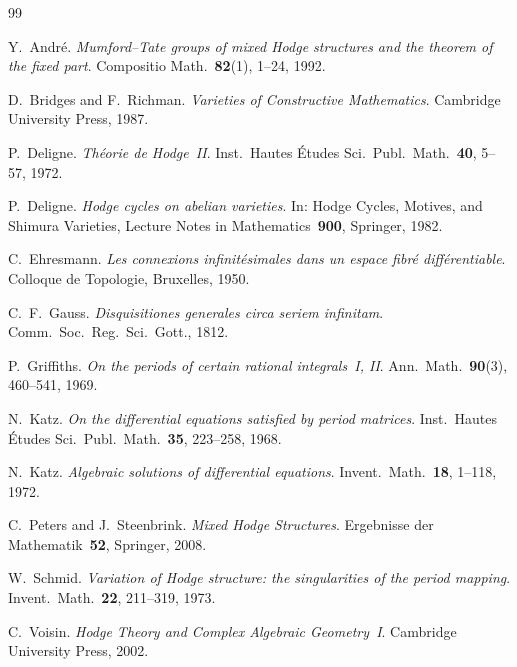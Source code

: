 \documentclass[11pt]{article}
\theoremstyle{plain}
\theoremstyle{definition}
\theoremstyle{remark}
\begin{document}
\begin{thebibliography}{99}

Y.~Andr\'{e}.
\newblock \emph{Mumford--Tate groups of mixed Hodge structures
  and the theorem of the fixed part}.
\newblock Compositio Math.\ \textbf{82}(1), 1--24, 1992.

D.~Bridges and F.~Richman.
\newblock \emph{Varieties of Constructive Mathematics}.
\newblock Cambridge University Press, 1987.

P.~Deligne.
\newblock \emph{Th\'{e}orie de Hodge~II}.
\newblock Inst.\ Hautes \'{E}tudes Sci.\ Publ.\ Math.\
  \textbf{40}, 5--57, 1972.

P.~Deligne.
\newblock \emph{Hodge cycles on abelian varieties}.
\newblock In: Hodge Cycles, Motives, and Shimura Varieties,
  Lecture Notes in Mathematics~\textbf{900}, Springer, 1982.

C.~Ehresmann.
\newblock \emph{Les connexions infinit\'{e}simales dans un
  espace fibr\'{e} diff\'{e}rentiable}.
\newblock Colloque de Topologie, Bruxelles, 1950.

C.~F.~Gauss.
\newblock \emph{Disquisitiones generales circa seriem infinitam}.
\newblock Comm.\ Soc.\ Reg.\ Sci.\ Gott., 1812.

P.~Griffiths.
\newblock \emph{On the periods of certain rational integrals~I, II}.
\newblock Ann.\ Math.\ \textbf{90}(3), 460--541, 1969.

N.~Katz.
\newblock \emph{On the differential equations satisfied by period matrices}.
\newblock Inst.\ Hautes \'{E}tudes Sci.\ Publ.\ Math.\ \textbf{35}, 223--258, 1968.

N.~Katz.
\newblock \emph{Algebraic solutions of differential equations}.
\newblock Invent.\ Math.\ \textbf{18}, 1--118, 1972.

C.~Peters and J.~Steenbrink.
\newblock \emph{Mixed Hodge Structures}.
\newblock Ergebnisse der Mathematik~\textbf{52}, Springer, 2008.

W.~Schmid.
\newblock \emph{Variation of Hodge structure: the singularities
  of the period mapping}.
\newblock Invent.\ Math.\ \textbf{22}, 211--319, 1973.

C.~Voisin.
\newblock \emph{Hodge Theory and Complex Algebraic Geometry~I}.
\newblock Cambridge University Press, 2002.


\end{thebibliography}
\end{document}
